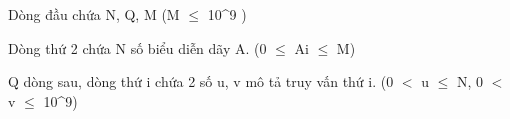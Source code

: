 Dòng đầu chứa N, Q, M (M  $\le$  10^9 )

Dòng thứ 2 chứa N số biểu diễn dãy A. (0  $\le$  Ai  $\le$  M)

Q dòng sau, dòng thứ i chứa 2 số u, v mô tả truy vấn thứ i. (0 $<$ u  $\le$  N, 0 $<$ v  $\le$  10^9)